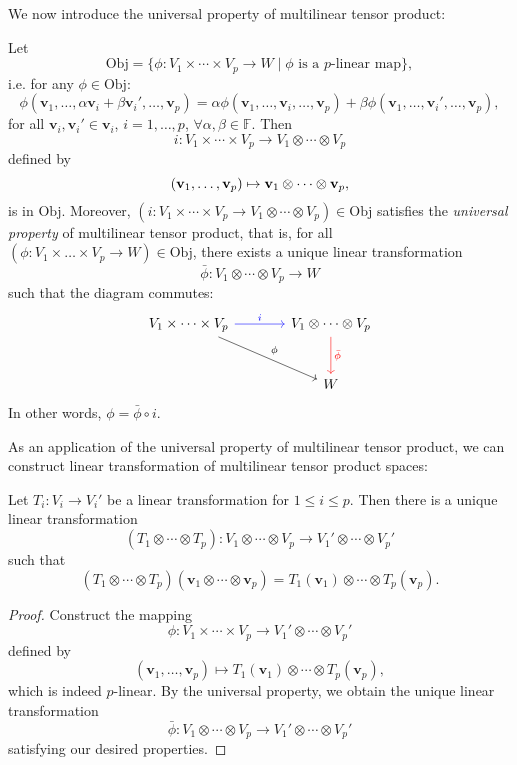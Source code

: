 We now introduce the universal property of multilinear tensor product:
\begin{theorem}\label{thm:multi_tensor_universal}
Let 
$$\mathrm{Obj} = \{ \phi : V_1 \times \cdots \times V_p \to W \mid \phi \text{ is a $p$-linear map} \},$$ 
i.e. for any $\phi \in \mathrm{Obj}$:
\[
\phi(\mathbf{v}_1, \ldots, \alpha \mathbf{v}_i + \beta \mathbf{v}_i', \ldots, \mathbf{v}_p) 
= \alpha \phi(\mathbf{v}_1, \ldots, \mathbf{v}_i, \ldots, \mathbf{v}_p)
+ \beta \phi(\mathbf{v}_1, \ldots, \mathbf{v}_i', \ldots, \mathbf{v}_p),
\]
for all $\mathbf{v}_i, \mathbf{v}_i' \in \mathbf{v}_i$, $i = 1, \ldots, p$, $\forall \alpha, \beta \in \mathbb{F}$. Then
\[i : V_1 \times \cdots \times V_p \to V_1 \otimes \cdots \otimes V_p\]
defined by
\[({\bf v}_1, \ldots, {\bf v}_p) \mapsto {\bf v}_1 \otimes \cdots \otimes {\bf v}_p,
\]
is in $\mathrm{Obj}$. Moreover, $(i : V_1 \times \cdots \times V_p \to V_1 \otimes \cdots \otimes V_p) \in \mathrm{Obj}$ satisfies the \emph{universal property} of multilinear tensor product, that is, for all $(\phi: V_1 \times \dots \times V_p \to W) \in \mathrm{Obj}$, there exists a unique linear transformation
\[
\bar{\phi} : V_1 \otimes \cdots \otimes V_p \to W
\]
such that the diagram commutes:
\[
\begin{tikzcd}[column sep=large, row sep=large]
V_1 \times \cdots \times V_p 
\arrow[r, "i", blue] \arrow[dr, "\phi"] &
V_1 \otimes \cdots \otimes V_p 
\arrow[d, "\bar{\phi}", red] \\
& W
\end{tikzcd}
\]
\noindent In other words, \(\phi = \bar{\phi} \circ i\). 
\end{theorem}

As an application of the universal property of multilinear tensor product, we can construct linear transformation of multilinear tensor product spaces:
\begin{corollary} \label{cor:multi_linear_trans}
Let \( T_i : V_i \to V_i' \) be a linear transformation for \( 1 \leq i \leq p \). Then there is a unique linear transformation
\[
(T_1 \otimes \cdots \otimes T_p) : V_1 \otimes \cdots \otimes V_p \to V_1' \otimes \cdots \otimes V_p'
\]
such that
\[
(T_1 \otimes \cdots \otimes T_p)(\mathbf{v}_1 \otimes \cdots \otimes \mathbf{v}_p) = T_1(\mathbf{v}_1) \otimes \cdots \otimes T_p(\mathbf{v}_p).
\]
\end{corollary}

\begin{proof}
Construct the mapping
\[
\phi : V_1 \times \cdots \times V_p \to V_1' \otimes \cdots \otimes V_p'
\]
defined by
\[
(\mathbf{v}_1, \ldots, \mathbf{v}_p) \mapsto T_1(\mathbf{v}_1) \otimes \cdots \otimes T_p(\mathbf{v}_p),
\]
which is indeed \( p \)-linear.  
By the universal property, we obtain the unique linear transformation
\[
\bar{\phi} : V_1 \otimes \cdots \otimes V_p \to V_1' \otimes \cdots \otimes V_p'
\]
satisfying our desired properties.
\end{proof}

